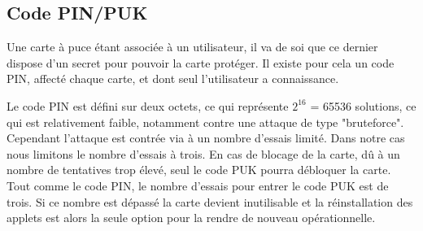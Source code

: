 \documentclass[a4paper,11pt,french]{article}
\begin{document}
\subsection{Code PIN/PUK}
Une carte à puce étant associée à un utilisateur, il va de soi que ce dernier 
dispose d'un secret pour pouvoir la carte protéger. Il existe pour cela un code 
PIN, affecté chaque carte, et dont seul l'utilisateur a connaissance.

Le code PIN est défini sur deux octets, ce qui représente $2^{16}$ = 65536 solutions,
ce qui est relativement faible, notamment contre une attaque de type 
"bruteforce". Cependant l'attaque est contrée via à un nombre d'essais limité.
Dans notre cas nous limitons le nombre d'essais à trois. En cas de blocage de la
carte, dû à un nombre de tentatives trop élevé, seul le code PUK pourra 
débloquer la carte. Tout comme le code PIN, le nombre d'essais pour entrer le 
code PUK est de trois. Si ce nombre est dépassé la carte devient inutilisable et
la réinstallation des applets est alors la seule option pour la rendre
de nouveau opérationnelle.
\end{document}
